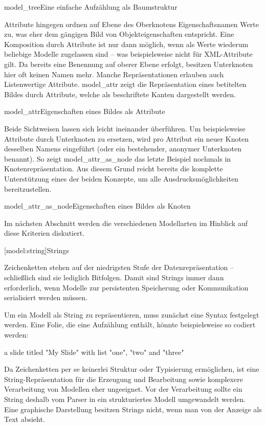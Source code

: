 \documentclass[12pt, a4paper, bibgerm]{scrbook}
\newenvironment{DIFnomarkup}{}{}
\newcommand\lsection{}
\newcommand\abb{}
\newcommand\fig{}
\begin{document}
\fig{model_tree}{Eine einfache Aufzählung als Baumstruktur}

Attribute hingegen ordnen auf Ebene des Oberknotens Eigenschaftsnamen
Werte zu, was eher dem gängigen Bild von Objekteigenschaften
entspricht. Eine Komposition durch Attribute ist nur dann möglich, wenn
als Werte wiederum beliebige Modelle zugelassen sind -- was
beispielsweise nicht für XML-Attribute gilt. Da bereits eine Benennung auf
oberer Ebene erfolgt, besitzen Unterknoten hier oft keinen Namen
mehr. Manche Repräsentationen erlauben auch Listenwertige
Attribute. \abb{model_attr} zeigt die Repräsentation eines betitelten
Bildes durch Attribute, welche als beschriftete Kanten dargestellt
werden.

\fig{model_attr}{Eigenschaften eines Bildes als Attribute}

Beide Sichtweisen lassen sich leicht ineinander überführen. Um
beispielsweise Attribute durch Unterknoten zu ersetzen, wird pro
Attribut ein neuer Knoten desselben Namens eingeführt (oder ein
bestehender, anonymer Unterknoten benannt). So zeigt
\abb{model_attr_as_node} das letzte Beispiel nochmals in
Knotenrepräsentation. Aus diesem Grund reicht bereits die komplette
Unterstützung eines der beiden Konzepte, um alle Ausdrucksmöglichkeiten
bereitzustellen.

\fig{model_attr_as_node}{Eigenschaften eines Bildes als Knoten}

\medskip{}

Im nächsten Abschnitt werden die verschiedenen Modellarten im Hinblick
auf diese Kriterien diskutiert.

\lsection[model:string]{Strings}

Zeichenketten stehen auf der niedrigsten Stufe der Datenrepräsentation --
schließlich sind sie lediglich Bitfolgen. Damit sind Strings immer dann
erforderlich, wenn Modelle zur persistenten Speicherung oder
Kommunikation serialisiert werden müssen.

Um ein Modell als String zu repräsentieren, muss zunächst eine Syntax
festgelegt werden. Eine Folie, die eine Aufzählung enthält, könnte
beispielsweise so codiert werden:
\begin{DIFnomarkup}\begin{code}
a slide titled "My Slide" with list "one", "two" and "three"  
\end{code}\end{DIFnomarkup}

Da Zeichenketten per se keinerlei Struktur oder Typisierung ermöglichen, ist
eine String-Repräsentation für die Erzeugung und Bearbeitung sowie
komplexere Verarbeitung von Modellen eher ungeeignet. Vor der
Verarbeitung sollte ein String deshalb vom Parser in ein strukturiertes
Modell umgewandelt werden. Eine graphische Darstellung besitzen Strings
nicht, wenn man von der Anzeige als Text absieht.
\end{document}
